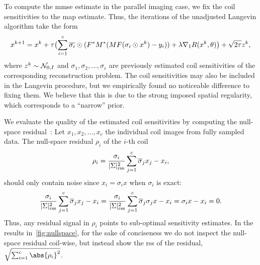 To compute the \gls{mmse} estimate in the parallel imaging case, we fix the coil sensitivities to the \gls{map} estimate.
Thus, the iterations of the unadjusted Langevin algorithm take the form
\begin{equation}
	x^{k+\num{1}} = x^{k} + \tau \bigl( \sum_{i=\num{1}}^c \overline{\sigma_i} \odot (F^{\ast}M^{\ast}(MF(\sigma_i\odot x^k) - y_i)) + \lambda \nabla_{\num{1}} R(x^k, \theta) \bigr) + \sqrt{\num{2}\tau} z^k,
\end{equation}
where \( z^k \sim \mathcal{N}_{\num{0}, I} \) and \( \sigma_{\num{1}}, \sigma_{\num{2}},\dotsc, \sigma_c \) are previously estimated coil sensitivities of the corresponding reconstruction problem.
The coil sensitivities may also be included in the Langevin procedure, but we empirically found no noticeable difference to fixing them.
We believe that this is due to the strong imposed spatial regularity, which corresponds to a \enquote{narrow} prior.

We evaluate the quality of the estimated coil sensitivities by computing the null-space residual~\cite{uecker_espirit_13}:
Let \( x_{\num{1}}, x_{\num{2}}, \dotsc, x_{c} \) the individual coil images from fully sampled data.
The null-space residual \( \rho_i \) of the \( i \)-th coil
\begin{equation}
	\rho_i = \frac{\sigma_i}{|\Sigma|^{\num{2}}_{\mathrm{rss}}} \sum_{j=\num{1}}^{c} \overline{\sigma}_j x_j - x_i,
	\label{eqq:null space residual}
\end{equation}
should only contain noise since \( x_i = \sigma_i x \) when \( \sigma_i \) is exact:
\begin{equation}
	\frac{\sigma_i}{|\Sigma|^{\num{2}}_{\mathrm{rss}}} \sum_{j=\num{1}}^{c} \overline{\sigma}_j x_j - x_i = 
	\frac{\sigma_i}{|\Sigma|^{\num{2}}_{\mathrm{rss}}} \sum_{j=\num{1}}^{c} \overline{\sigma}_j \sigma_j x - x_i = \sigma_i x - x_i = \num{0}.
\end{equation}
Thus, any residual signal in \( \rho_i \) points to sub-optimal sensitivity estimates.
In the results in~\cref{fig:nullspace}, for the sake of conciseness we do not inspect the null-space residual coil-wise, but instead show the \gls{rss} of the residual, \( \sqrt{\sum_{i=\num{1}}^c \abs{\rho_i}^{\num{2}}} \).
